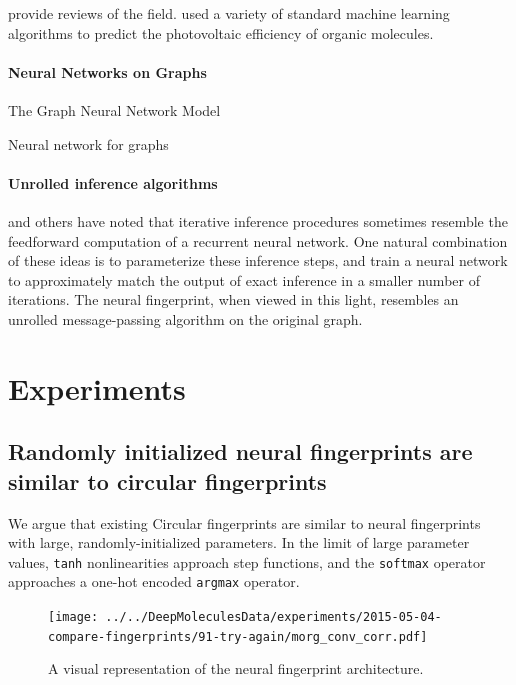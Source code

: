 \documentclass{article}
\begin{document}
\cite{Eckert2007225, bergeron2011modeling} provide reviews of the field.
\cite{tingley2014towards} used a variety of standard machine learning algorithms to predict the photovoltaic efficiency of organic molecules.

\paragraph{Neural Networks on Graphs}

\cite{graphnn2009} The Graph Neural Network Model

\cite{micheli2009neural} Neural network for graphs

\paragraph{Unrolled inference algorithms}
\citet{hershey2014deep} and others have noted that iterative inference procedures sometimes resemble the feedforward computation of a recurrent neural network.
One natural combination of these ideas is to parameterize these inference steps, and train a neural network to approximately match the output of exact inference in a smaller number of iterations.
The neural fingerprint, when viewed in this light, resembles an unrolled message-passing algorithm on the original graph.


\section{Experiments}


\subsection{Randomly initialized neural fingerprints are similar to circular fingerprints}
\label{sec:random is equivalent}

We argue that existing Circular fingerprints are similar to neural fingerprints with large, randomly-initialized parameters.
In the limit of large parameter values, \texttt{tanh} nonlinearities approach step functions, and the \texttt{softmax} operator approaches a one-hot encoded \texttt{argmax} operator.

\begin{figure}[h]
\centerline{\texttt{[image: ../../DeepMoleculesData/experiments/2015-05-04-compare-fingerprints/91-try-again/morg\_conv\_corr.pdf]}}
\caption{A visual representation of the neural fingerprint architecture.
}
\label{fig:fingerprint similarity}
\end{figure}
\end{document}
